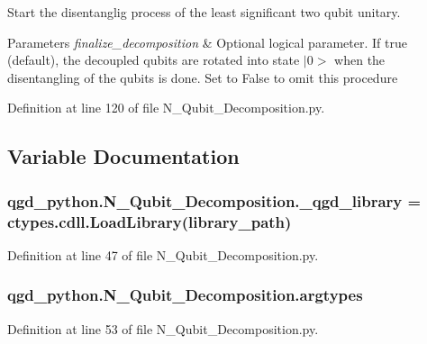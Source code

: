 Start the disentanglig process of the least significant two qubit unitary. 


\begin{DoxyParams}{Parameters}
{\em finalize\+\_\+decomposition} & Optional logical parameter. If true (default), the decoupled qubits are rotated into state $\vert$0$>$ when the disentangling of the qubits is done. Set to False to omit this procedure \\
\hline
\end{DoxyParams}


Definition at line 120 of file N\+\_\+\+Qubit\+\_\+\+Decomposition.\+py.



\subsection{Variable Documentation}
\subsubsection[{\texorpdfstring{\+\_\+qgd\+\_\+library}{_qgd_library}}]{\setlength{\rightskip}{0pt plus 5cm}qgd\+\_\+python.\+N\+\_\+\+Qubit\+\_\+\+Decomposition.\+\_\+qgd\+\_\+library = ctypes.\+cdll.\+Load\+Library(library\+\_\+path)\hspace{0.3cm}{\ttfamily [private]}}\hypertarget{group__python_gaab3ee0c640088387c37d0bea14b0bbd0}{}\label{group__python_gaab3ee0c640088387c37d0bea14b0bbd0}


Definition at line 47 of file N\+\_\+\+Qubit\+\_\+\+Decomposition.\+py.

\subsubsection[{\texorpdfstring{argtypes}{argtypes}}]{\setlength{\rightskip}{0pt plus 5cm}qgd\+\_\+python.\+N\+\_\+\+Qubit\+\_\+\+Decomposition.\+argtypes}\hypertarget{group__python_gacb3a3a21bbd6fbe8c612122ea586f1e9}{}\label{group__python_gacb3a3a21bbd6fbe8c612122ea586f1e9}


Definition at line 53 of file N\+\_\+\+Qubit\+\_\+\+Decomposition.\+py.

